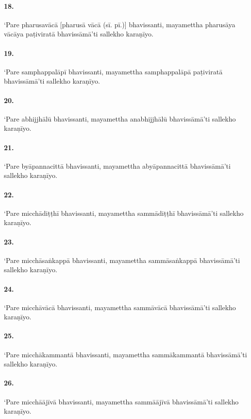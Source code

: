 \paragraph{18.} ‘Pare pharusavācā [pharusā vācā (sī. pī.)] bhavissanti, mayamettha pharusāya vācāya paṭiviratā bhavissāmā’ti sallekho karaṇīyo.

\paragraph{19.} ‘Pare samphappalāpī bhavissanti, mayamettha samphappalāpā paṭiviratā bhavissāmā’ti sallekho karaṇīyo.

\paragraph{20.} ‘Pare abhijjhālū bhavissanti, mayamettha anabhijjhālū bhavissāmā’ti sallekho karaṇīyo.

\paragraph{21.} ‘Pare byāpannacittā bhavissanti, mayamettha abyāpannacittā bhavissāmā’ti sallekho karaṇīyo.

\paragraph{22.} ‘Pare micchādiṭṭhī bhavissanti, mayamettha sammādiṭṭhī bhavissāmā’ti sallekho karaṇīyo.

\paragraph{23.} ‘Pare micchāsaṅkappā bhavissanti, mayamettha sammāsaṅkappā bhavissāmā’ti sallekho karaṇīyo.

\paragraph{24.} ‘Pare micchāvācā bhavissanti, mayamettha sammāvācā bhavissāmā’ti sallekho karaṇīyo.

\paragraph{25.} ‘Pare micchākammantā bhavissanti, mayamettha sammākammantā bhavissāmā’ti sallekho karaṇīyo.

\paragraph{26.} ‘Pare micchāājīvā bhavissanti, mayamettha sammāājīvā bhavissāmā’ti sallekho karaṇīyo.

